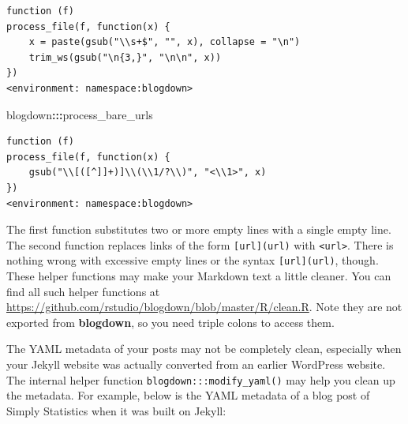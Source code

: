 \documentclass[12pt,]{krantz}
\makeatletter
\newenvironment{Shaded}{\begin{snugshade}}{\end{snugshade}}
\newcommand{\NormalTok}[1]{#1}
\newcommand{\OperatorTok}[1]{\textcolor[rgb]{0.81,0.36,0.00}{\textbf{#1}}}
\newenvironment{kframe}{%
\medskip{}
\setlength{\fboxsep}{.8em}
 \def\at@end@of@kframe{}%
 \ifinner\ifhmode%
  \def\at@end@of@kframe{\end{minipage}}%
  \begin{minipage}{\columnwidth}%
 \fi\fi%
 \def\FrameCommand##1{\hskip\@totalleftmargin \hskip-\fboxsep
 \colorbox{shadecolor}{##1}\hskip-\fboxsep
     \hskip-\linewidth \hskip-\@totalleftmargin \hskip\columnwidth}%
 \MakeFramed {\advance\hsize-\width
   \@totalleftmargin\z@ \linewidth\hsize
   \@setminipage}}%
 {\par\unskip\endMakeFramed%
 \at@end@of@kframe}
\renewenvironment{Shaded}{\begin{kframe}}{\end{kframe}}
\theoremstyle{definition}
\theoremstyle{definition}
\theoremstyle{definition}
\theoremstyle{remark}
\makeatother
\begin{document}
\begin{verbatim}
function (f) 
process_file(f, function(x) {
    x = paste(gsub("\\s+$", "", x), collapse = "\n")
    trim_ws(gsub("\n{3,}", "\n\n", x))
})
<environment: namespace:blogdown>
\end{verbatim}

\begin{Shaded}
\begin{Highlighting}[]
\NormalTok{blogdown}\OperatorTok{:::}\NormalTok{process_bare_urls}
\end{Highlighting}
\end{Shaded}

\begin{verbatim}
function (f) 
process_file(f, function(x) {
    gsub("\\[([^]]+)]\\(\\1/?\\)", "<\\1>", x)
})
<environment: namespace:blogdown>
\end{verbatim}

The first function substitutes two or more empty lines with a single
empty line. The second function replaces links of the form
\texttt{{[}url{]}(url)} with \texttt{\textless{}url\textgreater{}}.
There is nothing wrong with excessive empty lines or the syntax
\texttt{{[}url{]}(url)}, though. These helper functions may make your
Markdown text a little cleaner. You can find all such helper functions
at \url{https://github.com/rstudio/blogdown/blob/master/R/clean.R}. Note
they are not exported from \textbf{blogdown}, so you need triple colons
to access them.

The YAML metadata of your posts may not be completely clean, especially
when your Jekyll website was actually converted from an earlier
WordPress website. The internal helper function
\texttt{blogdown:::modify\_yaml()} may help you clean up the metadata.
For example, below is the YAML metadata of a blog post of Simply
Statistics when it was built on Jekyll:
\end{document}
